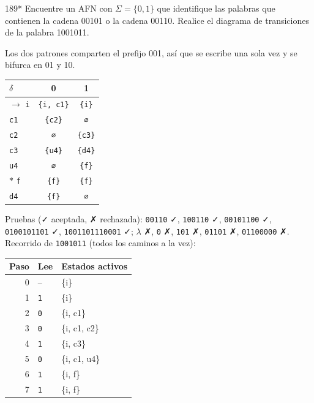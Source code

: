 \documentclass[11pt]{article}
\begin{document}
\begin{ejercicio}{189}{*}
Encuentre un AFN con $\Sigma = \{0, 1\}$ que identifique las palabras que contienen la cadena 00101 o la cadena 00110. Realice el diagrama de transiciones de la palabra 1001011.
\end{ejercicio}
\proc Los dos patrones comparten el prefijo 001, así que se escribe una sola vez y se bifurca en 01 y 10.
\begin{center}\small\begin{tabular}{lcc}\toprule
$\delta$ & 0 & 1 \\\midrule
$\to$ \texttt{i} & \texttt{\{i, c1\}} & \texttt{\{i\}} \\
 \texttt{c1} & \texttt{\{c2\}} & \texttt{∅} \\
 \texttt{c2} & \texttt{∅} & \texttt{\{c3\}} \\
 \texttt{c3} & \texttt{\{u4\}} & \texttt{\{d4\}} \\
 \texttt{u4} & \texttt{∅} & \texttt{\{f\}} \\
$*$ \texttt{f} & \texttt{\{f\}} & \texttt{\{f\}} \\
 \texttt{d4} & \texttt{\{f\}} & \texttt{∅} \\
\bottomrule\end{tabular}\end{center}
Pruebas (✓ aceptada, ✗ rechazada): \texttt{00110} ✓, \texttt{100110} ✓, \texttt{00101100} ✓, \texttt{0100101101} ✓, \texttt{1001101110001} ✓; $\lambda$ ✗, \texttt{0} ✗, \texttt{101} ✗, \texttt{01101} ✗, \texttt{01100000} ✗.
Recorrido de \texttt{1001011} (todos los caminos a la vez):
\begin{center}\footnotesize\begin{tabular}{rll}\toprule Paso & Lee & Estados activos \\\midrule
0 & -- & \{i\} \\
1 & \texttt{1} & \{i\} \\
2 & \texttt{0} & \{i, c1\} \\
3 & \texttt{0} & \{i, c1, c2\} \\
4 & \texttt{1} & \{i, c3\} \\
5 & \texttt{0} & \{i, c1, u4\} \\
6 & \texttt{1} & \{i, f\} \\
7 & \texttt{1} & \{i, f\} \\
\bottomrule\end{tabular}\end{center}
\end{document}
